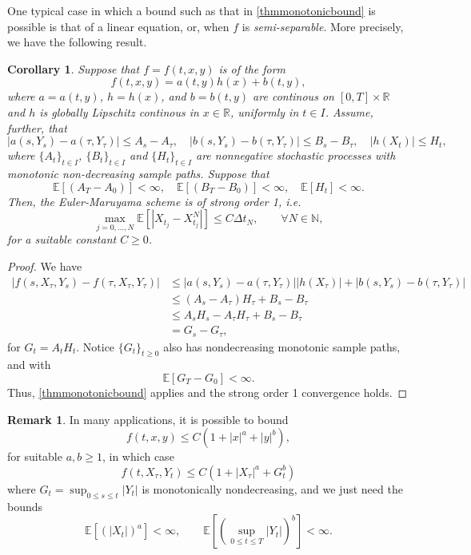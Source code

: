 \documentclass[reqno,12pt]{amsart}
\theoremstyle{plain}%
\newtheorem{cor}{Corollary}[section]
\theoremstyle{definition}
\newtheorem{rmk}{Remark}[section]
\begin{document}
One typical case in which a bound such as that in \cref{thmmonotonicbound} is possible is that of a linear equation, or, when $f$ is \emph{semi-separable}. More precisely, we have the following result.

\begin{cor}
    \label{thmsemiseparablemonotonicbound}
  Suppose that $f=f(t, x, y)$ is of the form
  \begin{equation}
    \label{lineareqform}
    f(t, x, y) = a(t, y)h(x) + b(t, y),
  \end{equation}
  where $a=a(t, y)$, $h=h(x)$, and $b=b(t, y)$ are continous on $[0, T]\times \mathbb{R}$ and $h$ is globally Lipschitz continous in $x\in\mathbb{R}$, uniformly in $t\in I$. Assume, further, that
  \[
    |a(s, Y_s) - a(\tau, Y_\tau)| \leq A_s - A_\tau, \quad |b(s, Y_s) - b(\tau, Y_\tau)| \leq B_s - B_\tau, \quad |h(X_t)| \leq H_t,
  \]
  where $\{A_t\}_{t\in I}$, $\{B_t\}_{t\in I}$ and $\{H_t\}_{t\in I}$ are nonnegative stochastic processes with monotonic non-decreasing sample paths. Suppose that
  \[
    \mathbb{E}[(A_T - A_0)] < \infty, \quad \mathbb{E}[(B_T - B_0)] < \infty, \quad \mathbb{E}[H_t] < \infty.
  \]
  Then, the Euler-Maruyama scheme is of strong order 1, i.e.
  \begin{equation}
    \max_{j=0, \ldots, N}\mathbb{E}\left[ \left| X_{t_j} - X_{t_j}^N \right| \right] \leq C \Delta t_N, \qquad \forall N \in \mathbb{N},
  \end{equation}
  for a suitable constant $C \geq 0$.
\end{cor}

\begin{proof}
    We have
    \begin{align*}
        |f(s, X_\tau, Y_s) - f(\tau, X_\tau, Y_\tau)| & \leq |a(s, Y_s) - a(\tau, Y_\tau)||h(X_\tau)| + |b(s, Y_s) - b(\tau, Y_\tau)| \\
        & \leq (A_s - A_\tau)H_\tau + B_s - B_\tau \\
        & \leq A_sH_s - A_\tau H_\tau + B_s - B_\tau \\
        & = G_s - G_\tau,
    \end{align*}
    for $G_t = A_tH_t$. Notice $\{G_t\}_{t\geq 0}$ also has nondecreasing monotonic sample paths, and with
    \[
        \mathbb{E}[G_T - G_0] < \infty.
    \]
    Thus, \cref{thmmonotonicbound} applies and the strong order 1 convergence holds.
\end{proof}

\begin{rmk}
    In many applications, it is possible to bound
    $$
        f(t, x, y) \leq C(1 + |x|^a + |y|^b),
    $$
    for suitable $a, b \geq 1$, in which case
    $$
        f(t, X_\tau, Y_t) \leq C(1 + |X_\tau|^a + G_t^b)
    $$
    where $G_t = \sup_{0 \leq s \leq t} |Y_t|$ is monotonically nondecreasing, and we just need the bounds
    $$
    \mathbb{E}[(|X_t|)^a] < \infty, \qquad \mathbb{E}[(\sup_{0\leq t \leq T} |Y_t|)^b] < \infty.
    $$
\end{rmk}
\end{document}
